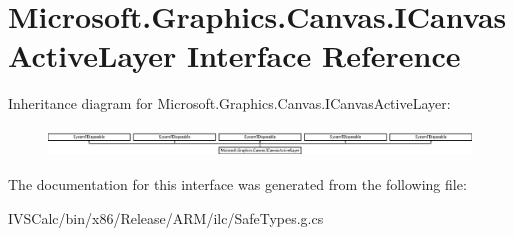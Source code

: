 \hypertarget{interface_microsoft_1_1_graphics_1_1_canvas_1_1_i_canvas_active_layer}{}\section{Microsoft.\+Graphics.\+Canvas.\+I\+Canvas\+Active\+Layer Interface Reference}
\label{interface_microsoft_1_1_graphics_1_1_canvas_1_1_i_canvas_active_layer}
Inheritance diagram for Microsoft.\+Graphics.\+Canvas.\+I\+Canvas\+Active\+Layer\+:\begin{figure}[H]
\begin{center}
\leavevmode
\includegraphics[height=0.761905cm]{interface_microsoft_1_1_graphics_1_1_canvas_1_1_i_canvas_active_layer}
\end{center}
\end{figure}


The documentation for this interface was generated from the following file\+:\begin{DoxyCompactItemize}
\item 
I\+V\+S\+Calc/bin/x86/\+Release/\+A\+R\+M/ilc/Safe\+Types.\+g.\+cs\end{DoxyCompactItemize}
